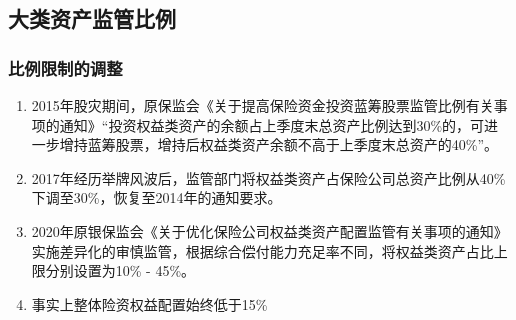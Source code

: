 \documentclass[a4paper,12pt]{ctexbeamer}
\begin{document}
\subsection{大类资产监管比例}
\begin{frame}
    \frametitle{比例限制的调整}
    \begin{enumerate}
        \item 2015年股灾期间，原保监会《关于提高保险资金投资蓝筹股票监管比例有关事项的通知》“投资权益类资产的余额占上季度末总资产比例达到30\%的，可进一步增持蓝筹股票，增持后权益类资产余额不高于上季度末总资产的40\%”。
        \item 2017年经历举牌风波后，监管部门将权益类资产占保险公司总资产比例从40\%下调至30\%，恢复至2014年的通知要求。
        \item 2020年原银保监会《关于优化保险公司权益类资产配置监管有关事项的通知》实施差异化的审慎监管，根据综合偿付能力充足率不同，将权益类资产占比上限分别设置为10\% - 45\%。
        \item 事实上整体险资权益配置始终低于15\%
    \end{enumerate}
\end{frame}
\end{document}
